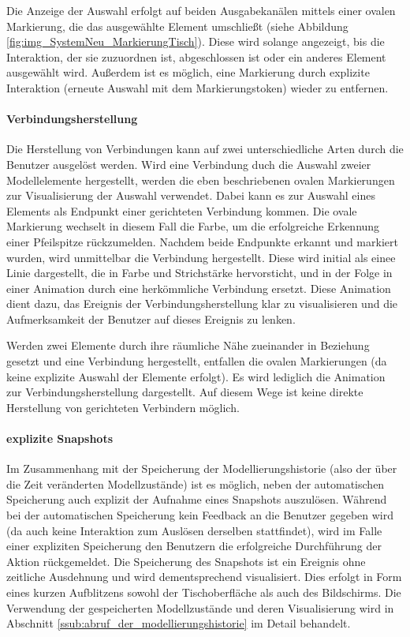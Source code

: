 Die Anzeige der Auswahl erfolgt auf beiden Ausgabekanälen mittels einer ovalen Markierung, die das ausgewählte Element umschließt (siehe Abbildung \ref{fig:img_SystemNeu_MarkierungTisch}). Diese wird solange angezeigt, bis die Interaktion, der sie zuzuordnen ist, abgeschlossen ist oder ein anderes Element ausgewählt wird. Außerdem ist es möglich, eine Markierung durch explizite Interaktion (erneute Auswahl mit dem Markierungstoken) wieder zu entfernen.

\paragraph{Verbindungsherstellung}

Die Herstellung von Verbindungen kann auf zwei unterschiedliche Arten durch die Benutzer ausgelöst werden. Wird eine Verbindung duch die Auswahl zweier Modellelemente hergestellt, werden die eben beschriebenen ovalen Markierungen zur Visualisierung der Auswahl verwendet. Dabei kann es zur Auswahl eines Elements als Endpunkt einer gerichteten Verbindung kommen. Die ovale Markierung wechselt in diesem Fall die Farbe, um die erfolgreiche Erkennung einer Pfeilspitze rückzumelden. Nachdem beide Endpunkte erkannt und markiert wurden, wird unmittelbar die Verbindung hergestellt. Diese wird initial als einee Linie dargestellt, die in Farbe und Strichstärke hervorsticht, und in der Folge in einer Animation durch eine herkömmliche Verbindung ersetzt. Diese Animation dient dazu, das Ereignis der Verbindungsherstellung klar zu visualisieren und die Aufmerksamkeit der Benutzer auf dieses Ereignis zu lenken.

Werden zwei Elemente durch ihre räumliche Nähe zueinander in Beziehung gesetzt und eine Verbindung hergestellt, entfallen die ovalen Markierungen (da keine explizite Auswahl der Elemente erfolgt). Es wird lediglich die Animation zur Verbindungsherstellung dargestellt. Auf diesem Wege ist keine direkte Herstellung von gerichteten Verbindern möglich. 

\paragraph{explizite Snapshots}

Im Zusammenhang mit der Speicherung der Modellierungshistorie (also der über die Zeit veränderten Modellzustände) ist es möglich, neben der automatischen Speicherung auch explizit der Aufnahme eines Snapshots auszulösen. Während bei der automatischen Speicherung kein Feedback an die Benutzer gegeben wird (da auch keine Interaktion zum Auslösen derselben stattfindet), wird im Falle einer expliziten Speicherung den Benutzern die erfolgreiche Durchführung der Aktion rückgemeldet. Die Speicherung des Snapshots ist ein Ereignis ohne zeitliche Ausdehnung und wird dementsprechend visualisiert. Dies erfolgt in Form eines kurzen Aufblitzens sowohl der Tischoberfläche als auch des Bildschirms. Die Verwendung der gespeicherten Modellzustände und deren Visualisierung wird in Abschnitt \ref{ssub:abruf_der_modellierungshistorie} im Detail behandelt.


